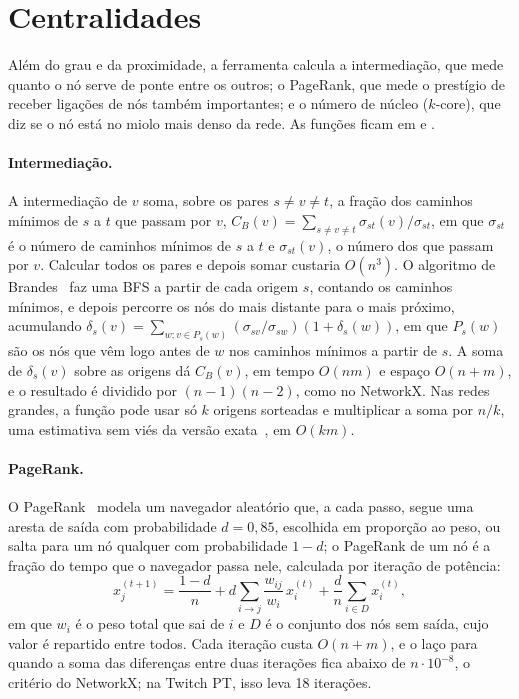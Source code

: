 \section{Centralidades}\label{sec:centralidades}

Além do grau e da proximidade, a ferramenta calcula a intermediação, que mede quanto o nó serve de
ponte entre os outros; o PageRank, que mede o prestígio de receber ligações de nós também
importantes; e o número de núcleo ($k$-core), que diz se o nó está no miolo mais denso da rede. As
funções ficam em  e .

\paragraph{Intermediação.} A intermediação de $v$ soma, sobre os pares $s \neq v \neq t$, a fração
dos caminhos mínimos de $s$ a $t$ que passam por $v$,
$C_B(v) = \sum_{s \neq v \neq t} \sigma_{st}(v)/\sigma_{st}$, em que $\sigma_{st}$ é o número de
caminhos mínimos de $s$ a $t$ e $\sigma_{st}(v)$, o número dos que passam por $v$. Calcular todos os pares e depois somar custaria $O(n^3)$. O algoritmo de
Brandes~\cite{brandes2001} faz uma BFS a partir de cada origem $s$, contando os caminhos mínimos, e
depois percorre os nós do mais distante para o mais próximo, acumulando
$\delta_s(v) = \sum_{w : v \in P_s(w)} (\sigma_{sv}/\sigma_{sw}) (1 + \delta_s(w))$, em que $P_s(w)$
são os nós que vêm logo antes de $w$ nos caminhos mínimos a partir de $s$. A soma de $\delta_s(v)$
sobre as origens dá $C_B(v)$, em tempo $O(nm)$ e espaço $O(n + m)$, e o resultado é dividido por
$(n-1)(n-2)$, como no NetworkX. Nas redes grandes, a função pode usar só $k$ origens sorteadas e
multiplicar a soma por $n/k$, uma estimativa sem viés da versão exata~\cite{brandes2007}, em $O(km)$.

\paragraph{PageRank.} O PageRank~\cite{brin1998} modela um navegador aleatório que, a cada passo,
segue uma aresta de saída com probabilidade $d = 0{,}85$, escolhida em proporção ao peso, ou salta
para um nó qualquer com probabilidade $1 - d$; o PageRank de um nó é a fração do tempo que o
navegador passa nele, calculada por iteração de potência:
\[
  x^{(t+1)}_j = \frac{1 - d}{n} + d \sum_{i \to j} \frac{w_{ij}}{w_i}\, x^{(t)}_i
               + \frac{d}{n} \sum_{i \in D} x^{(t)}_i ,
\]
em que $w_i$ é o peso total que sai de $i$ e $D$ é o conjunto dos nós sem saída, cujo valor é
repartido entre todos. Cada iteração custa $O(n + m)$, e o laço para quando a soma das diferenças
entre duas iterações fica abaixo de $n \cdot 10^{-8}$, o critério do NetworkX; na Twitch PT, isso
leva 18 iterações.

